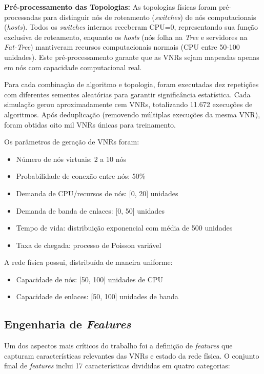 \documentclass[conference]{IEEEtran}
\begin{document}
\textbf{Pré-processamento das Topologias:} As topologias físicas foram pré-processadas para distinguir nós de roteamento (\textit{switches}) de nós computacionais (\textit{hosts}). Todos os \textit{switches} internos receberam CPU=0, representando sua função exclusiva de roteamento, enquanto os \textit{hosts} (nós folha na \textit{Tree} e servidores na \textit{Fat-Tree}) mantiveram recursos computacionais normais (CPU entre 50-100 unidades). Este pré-processamento garante que as VNRs sejam mapeadas apenas em nós com capacidade computacional real.

Para cada combinação de algoritmo e topologia, foram executadas dez repetições com diferentes sementes aleatórias para garantir significância estatística. Cada simulação gerou aproximadamente cem VNRs, totalizando 11.672 execuções de algoritmos. Após deduplicação (removendo múltiplas execuções da mesma VNR), foram obtidas oito mil VNRs únicas para treinamento.

Os parâmetros de geração de VNRs foram:

\begin{itemize}
    \item Número de nós virtuais: 2 a 10 nós
    \item Probabilidade de conexão entre nós: 50\%
    \item Demanda de CPU/recursos de nós: [0, 20] unidades
    \item Demanda de banda de enlaces: [0, 50] unidades
    \item Tempo de vida: distribuição exponencial com média de 500 unidades
    \item Taxa de chegada: processo de Poisson variável
\end{itemize}

A rede física possui, distribuída de maneira uniforme:

\begin{itemize}
    \item Capacidade de nós: [50, 100] unidades de CPU
    \item Capacidade de enlaces: [50, 100] unidades de banda
\end{itemize}

\subsection{Engenharia de \textit{Features}}

Um dos aspectos mais críticos do trabalho foi a definição de \textit{features} que capturam características relevantes das VNRs e estado da rede física. O conjunto final de \textit{features} inclui 17 características divididas em quatro categorias:
\end{document}
